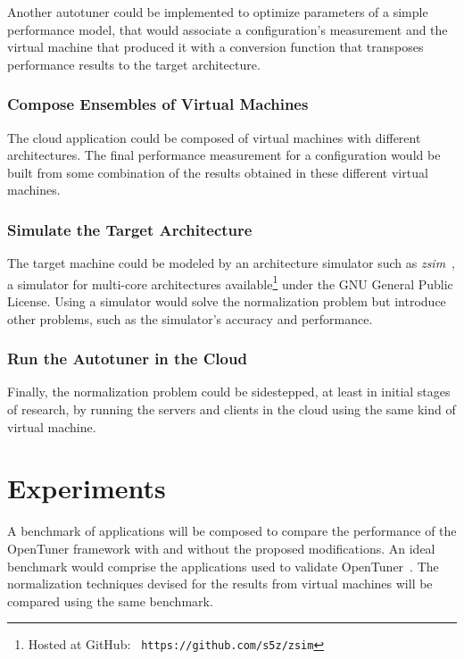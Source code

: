 \documentclass[a4paper, 12pt]{article}
\begin{document}
Another autotuner could be implemented to optimize parameters of a simple
performance model, that would associate a configuration's measurement and the
virtual machine that produced it with a conversion function that transposes
performance results to the target architecture.

\subsubsection{Compose Ensembles of Virtual Machines}

The cloud application could be composed of virtual machines with different
architectures. The final performance measurement for a configuration would be
built from some combination of the results obtained in these different virtual
machines.

\subsubsection{Simulate the Target Architecture}

The target machine could be modeled by an architecture simulator such as
\emph{zsim}~\cite{sanchez2013zsim}, a simulator for multi-core architectures
available\footnote{Hosted at GitHub: \texttt{\scriptsize
https://github.com/s5z/zsim}} under the GNU General Public License.  Using a
simulator would solve the normalization problem but introduce other problems,
such as the simulator's accuracy and performance.

\subsubsection{Run the Autotuner in the Cloud}

Finally, the normalization problem could be sidestepped, at least in initial
stages of research, by running the servers and clients in the cloud using
the same kind of virtual machine.

\section{Experiments} \label{sec:exp}

A benchmark of applications will be composed to compare the performance of the
OpenTuner framework with and without the proposed modifications.  An ideal
benchmark would comprise the applications used to validate
OpenTuner~\cite{ansel2014opentuner}.  The normalization techniques devised for
the results from virtual machines will be compared using the same benchmark.
\end{document}
